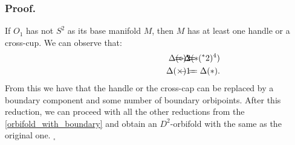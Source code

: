 \subsubsection{Proof.}
If $O_1$ has not $S^2$ as its base manifold $M$, then $M$ has at least one handle or a cross-cup. We can observe that:
\begin{align}
\hspace{3cm}\Delta(\circ) =& \hspace{-1cm} &-2& \hspace{-1cm} &= \Delta(\ast (^*2)^4) \\
\hspace{3cm}\Delta(\times) =& \hspace{-1cm} &-1& \hspace{-1cm} &= \Delta(\ast).
\end{align}
From this we have that the handle or the cross-cap can be replaced by a boundary component  
and some number of boundary orbipoints. After this reduction, we can proceed with all the 
other reductions from the \ref{orbifold_with_boundary} and obtain an $D^2$-orbifold 
with the same \Eoc as the original one. $_\square$


%




